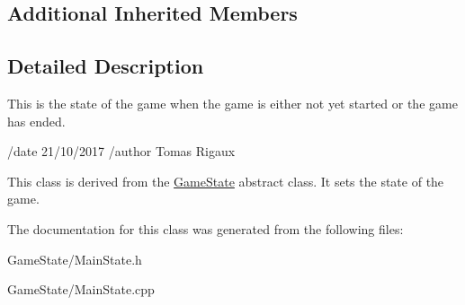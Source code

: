\subsection*{Additional Inherited Members}


\subsection{Detailed Description}
This is the state of the game when the game is either not yet started or the game has ended. 

/date 21/10/2017 /author Tomas Rigaux

This class is derived from the \hyperlink{classGameState}{Game\-State} abstract class. It sets the state of the game. 

The documentation for this class was generated from the following files\-:\begin{DoxyCompactItemize}
\item 
Game\-State/Main\-State.\-h\item 
Game\-State/Main\-State.\-cpp\end{DoxyCompactItemize}
